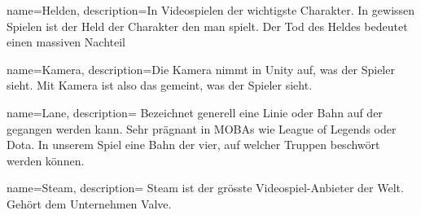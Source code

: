 {
  name={Helden},
  description={In Videospielen der wichtigste Charakter.
  In gewissen Spielen ist der Held der Charakter den man spielt.
  Der Tod des Heldes bedeutet einen massiven Nachteil}
}

{
  name={Kamera},
  description={Die Kamera nimmt in Unity auf, was der Spieler sieht.
  Mit Kamera ist also das gemeint, was der Spieler sieht.}
}

{
  name={Lane},
  description={
    Bezeichnet generell eine Linie oder Bahn auf der gegangen werden kann.
    Sehr prägnant in MOBAs wie League of Legends oder Dota.
    In unserem Spiel eine Bahn der vier, auf welcher Truppen beschwört werden können.}
}

{
  name={Steam},
  description={
    Steam ist der grösste Videospiel-Anbieter der Welt.
    Gehört dem Unternehmen Valve.}
}



